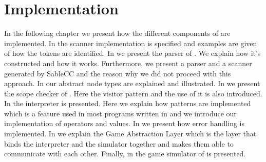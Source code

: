 \chapter{Implementation}
\label{chap:implementation}

In the following chapter we present how the different components of \productname{}
are implemented. In  the scanner
implementation is specified and examples are given of how the tokens are
identified. In  we present the parser of
\productname{}. We explain how it's constructed and how it works. Furthermore, we
present a parser and a scanner generated by SableCC and the reason why we did not
proceed with this approach. In  our abstract node types are
explained and illustrated. In  we present the scope
checker of \productname{}. Here the visitor pattern and the use of it is also
introduced. In  the interpreter is presented. Here we
explain how patterns are implemented which is a feature used in most programs
written in \productname{} and we introduce our implementation of operators and
values. In  we present how error handling is
implemented. In  we explain the Game
Abstraction Layer which is the layer that binds the interpreter and the
simulator together and makes them able to communicate with each other. Finally,
in  the game simulator of \productname{} is
presented.











